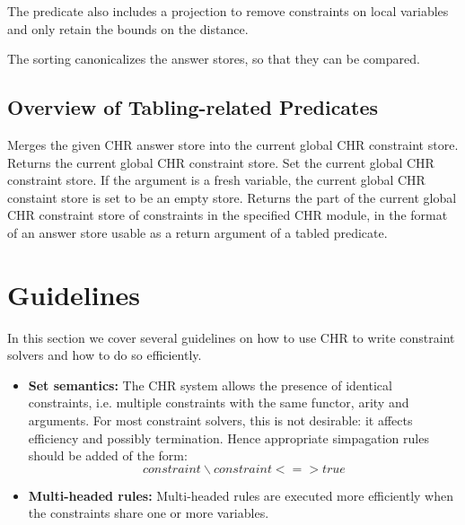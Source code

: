 The predicate also includes a projection to remove constraints on local variables 
and only retain the bounds on the distance.

The sorting canonicalizes the answer stores, so that they can be compared.

\subsection{Overview of Tabling-related Predicates}
\begin{description}
  Merges the given CHR answer store into the current global CHR constraint store.
  Returns the current global CHR constraint store.
  Set the current global CHR constraint store. If the argument is a fresh variable,
  the current global CHR constaint store is set to be an empty store.
  Returns the part of the current global CHR constraint store of constraints
  in the specified CHR module, in the format of an answer store
  usable as a return argument of a tabled predicate.
\end{description}

\section{Guidelines} \label{guidelines}

In this section we cover several guidelines on how to use CHR to write constraint solvers
and how to do so efficiently.
\begin{itemize}
\item \textbf{Set semantics:}
      The CHR system allows the presence of identical constraints, i.e. multiple constraints
      with the same functor, arity and arguments. For most constraint solvers, this is not
      desirable: it affects efficiency and possibly termination. Hence appropriate simpagation
      rules should be added of the form:
      \[ constraint \backslash constraint <=> true \]
\item \textbf{Multi-headed rules:}
      Multi-headed rules are executed more efficiently when the constraints share one or more variables.
\end{itemize}
